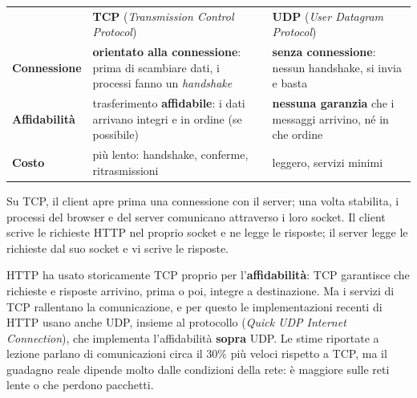 \begin{center}
\renewcommand{\arraystretch}{1.4}
\begin{tabular}{@{}>{\raggedright\arraybackslash}p{3.4cm}>{\raggedright\arraybackslash}p{5.6cm}>{\raggedright\arraybackslash}p{5.6cm}@{}}
  & \textbf{TCP} (\textit{Transmission Control Protocol}) & \textbf{UDP} (\textit{User Datagram Protocol}) \\
  \textbf{Connessione} & \textbf{orientato alla connessione}: prima di scambiare dati, i
    processi fanno un \textit{handshake} & \textbf{senza connessione}: nessun handshake, si invia e basta \\
  \textbf{Affidabilità} & trasferimento \textbf{affidabile}: i dati arrivano integri e in
    ordine (se possibile) & \textbf{nessuna garanzia} che i messaggi arrivino, né in che ordine \\
  \textbf{Costo} & più lento: handshake, conferme, ritrasmissioni & leggero, servizi minimi \\
\end{tabular}
\end{center}

Su TCP, il client apre prima una connessione con il server; una volta stabilita,
i processi del browser e del server comunicano attraverso i loro socket. Il
client scrive le richieste HTTP nel proprio socket e ne legge le risposte; il
server legge le richieste dal suo socket e vi scrive le risposte.

HTTP ha usato storicamente TCP proprio per l'\textbf{affidabilità}: TCP
garantisce che richieste e risposte arrivino, prima o poi, integre a
destinazione. Ma i servizi di TCP rallentano la comunicazione, e per questo le
implementazioni recenti di HTTP usano anche UDP, insieme al protocollo
 (\textit{Quick UDP Internet Connection}), che implementa
l'affidabilità \textbf{sopra} UDP. Le stime riportate a lezione parlano di
comunicazioni circa il 30\% più veloci rispetto a TCP, ma il guadagno reale
dipende molto dalle condizioni della rete: è maggiore sulle reti lente o che
perdono pacchetti.


